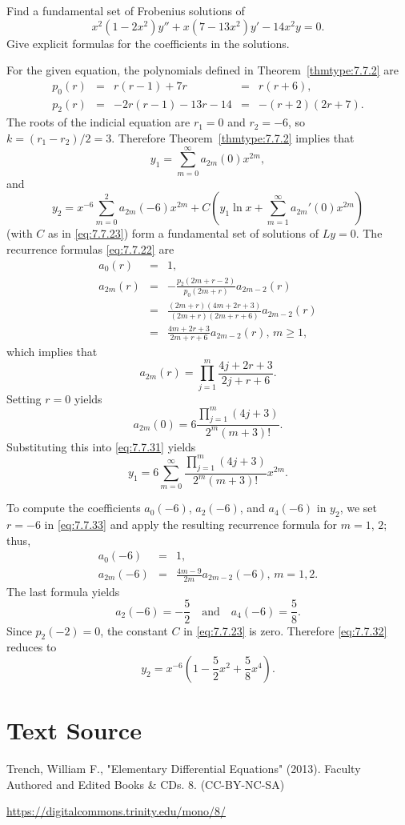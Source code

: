 \documentclass{ximera}
\begin{document}
\begin{example}\label{example:7.7.4}
Find a fundamental set of Frobenius  solutions of
$$
x^2(1-2x^2)y''+x(7-13x^2)y'-14x^2y=0.
$$
Give explicit formulas for the coefficients in the solutions.

\begin{explanation}
For  the given equation, the polynomials defined in
Theorem~\ref{thmtype:7.7.2} are
$$
\begin{array}{ccccc}
p_0(r)&=&r(r-1)+7r&=&r(r+6),\\
p_2(r)&=&-2r(r-1)-13r-14&=&-(r+2)(2r+7).
\end{array}
$$
The roots of the indicial equation are $r_1=0$ and $r_2=-6$,
so $k=(r_1-r_2)/2=3$. Therefore Theorem~\ref{thmtype:7.7.2} implies that
\begin{equation} \label{eq:7.7.31}
y_1=\sum_{m=0}^\infty a_{2m}(0)x^{2m},
\end{equation}
and
\begin{equation} \label{eq:7.7.32}
y_2=x^{-6}\sum_{m=0}^2a_{2m}(-6)x^{2m}+C\left(y_1\ln
x+\sum_{m=1}^\infty a_{2m}'(0)x^{2m}\right)
\end{equation}
(with $C$ as in \eqref{eq:7.7.23})
form a fundamental set of
solutions of $Ly=0$. The recurrence formulas \eqref{eq:7.7.22} are
\begin{equation} \label{eq:7.7.33}
\begin{array}{ccl}
a_0(r)&=&1,\\
a_{2m}(r)&=&-\frac{p_2(2m+r-2)}{p_0(2m+r)}a_{2m-2}(r)\\
&=&\frac{(2m+r)(4m+2r+3)}{(2m+r)(2m+r+6)}a_{2m-2}(r)\\
&=&\frac{4m+2r+3}{2m+r+6}a_{2m-2}(r),\,m\geq 1,
\end{array}
\end{equation}
which implies that
$$
a_{2m}(r)=\prod_{j=1}^m\frac{4j+2r+3}{2j+r+6}.
$$
Setting $r=0$  yields
$$
a_{2m}(0)=6\frac{\prod_{j=1}^m(4j+3)}{2^m(m+3)!}.
$$
Substituting this into \eqref{eq:7.7.31} yields
$$
y_1=6\sum_{m=0}^\infty \frac{\prod_{j=1}^m(4j+3)}{2^m(m+3)!}x^{2m}.
$$

To compute the coefficients $a_0(-6)$, $a_2(-6)$, and $a_4(-6)$ in
$y_2$, we
set $r=-6$ in \eqref{eq:7.7.33} and apply the resulting recurrence
formula for $m=1$, $2$;   thus,
\begin{eqnarray*}
a_0(-6)&=&1,\\
a_{2m}(-6)&=&\frac{4m-9}{2m}a_{2m-2}(-6),\,m=1,2.
\end{eqnarray*}
The last formula yields
$$
a_2(-6)=-\frac{5}{2}\quad\mbox{and}\quad a_4(-6)=\frac{5}{8}.
$$
Since $p_2(-2)=0$, the constant $C$  in \eqref{eq:7.7.23} is zero.
Therefore \eqref{eq:7.7.32} reduces to
$$
y_2=x^{-6}\left(1-\frac{5}{2}x^2+\frac{5}{8}x^4\right).
$$
\end{explanation}
\end{example}

\section*{Text Source}
Trench, William F., "Elementary Differential Equations" (2013). Faculty Authored and Edited Books \& CDs. 8. (CC-BY-NC-SA)

\href{https://digitalcommons.trinity.edu/mono/8/}{https://digitalcommons.trinity.edu/mono/8/}
\end{document}
